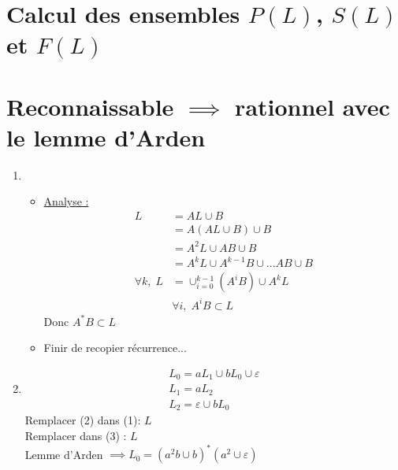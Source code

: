 \documentclass{article}
\begin{document}
\section{Calcul des ensembles $P(L)$, $S(L)$ et $F(L)$}

\section{Reconnaissable $\implies$ rationnel avec le lemme d'Arden}

\begin{enumerate}
    \item 
    \begin{itemize}
        \item \underline{Analyse :}
        \begin{align*}
            L &= AL \cup B \\
            &= A(AL \cup B) \cup B \\
            &= A^2L \cup AB \cup B \\
            &= A^kL \cup A^{k-1}B \cup ... AB \cup B \\
            \forall k, \; L &= \cup_{i = 0}^{k - 1} (A^iB) \cup A^kL \\
            &\forall i, \; A^iB \subset L
         \end{align*}
         Donc $A^*B \subset L$
        \item Finir de recopier récurrence...
    \end{itemize}
    \item \begin{align}
        L_0 = aL_1 \cup bL_0 \cup \varepsilon \\
        L_1 = aL_2 \\
        L_2 = \varepsilon \cup bL_0
    \end{align}
    Remplacer (2) dans (1): $L$ \\
    Remplacer dans (3) : $L$ \\
    Lemme d'Arden $\implies L_0 = (a^2b \cup b)^*(a^2 \cup \varepsilon)$
\end{enumerate}
\end{document}
